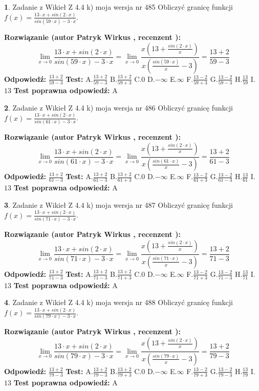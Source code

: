 \documentclass[12pt, a4paper]{article}
\theoremstyle{definition} %
\newtheorem{zad}{}
\newcommand{\zadStart}[1]{\begin{zad}#1\newline}
\newcommand{\zadStop}{\end{zad}}
\newcommand{\rozwStart}[2]{\noindent \textbf{Rozwiązanie (autor #1 , recenzent #2): }\newline}
\newcommand{\rozwStop}{\newline}
\newcommand{\odpStart}{\noindent \textbf{Odpowiedź:}\newline}
\newcommand{\odpStop}{\newline}
\newcommand{\testStart}{\noindent \textbf{Test:}\newline}
\newcommand{\testStop}{\newline}
\newcommand{\kluczStart}{\noindent \textbf{Test poprawna odpowiedź:}\newline}
\newcommand{\kluczStop}{\newline}
\begin{document}
\zadStart{Zadanie z Wikieł Z 4.4 k) moja wersja nr 485}
Obliczyć granicę funkcji $f(x)=\frac{13\cdot x +sin(2\cdot x)}{sin(59\cdot x) -3\cdot x}$.
\zadStop
\rozwStart{Patryk Wirkus}{}
$$\lim\limits_{x\to 0}\frac{13\cdot x +sin(2\cdot x)}{sin(59\cdot x) -3\cdot x}
=\lim\limits_{x\to 0}\frac{x(13+\frac{sin(2\cdot x)}{x})}{x(\frac{sin(59\cdot x)}{x}-3)}
=\frac{13+2}{59-3}$$
\rozwStop
\odpStart
$\frac{13+2}{59-3}$
\odpStop
\testStart
A.$\frac{13+2}{59-3}$
B.$\frac{13+2}{59+3}$
C.$0$
D.$-\infty$
E.$\infty$
F.$\frac{13-2}{59+3}$
G.$\frac{13-2}{59-3}$
H.$\frac{13}{59}$
I.$13$
\testStop
\kluczStart
A
\kluczStop



\zadStart{Zadanie z Wikieł Z 4.4 k) moja wersja nr 486}
Obliczyć granicę funkcji $f(x)=\frac{13\cdot x +sin(2\cdot x)}{sin(61\cdot x) -3\cdot x}$.
\zadStop
\rozwStart{Patryk Wirkus}{}
$$\lim\limits_{x\to 0}\frac{13\cdot x +sin(2\cdot x)}{sin(61\cdot x) -3\cdot x}
=\lim\limits_{x\to 0}\frac{x(13+\frac{sin(2\cdot x)}{x})}{x(\frac{sin(61\cdot x)}{x}-3)}
=\frac{13+2}{61-3}$$
\rozwStop
\odpStart
$\frac{13+2}{61-3}$
\odpStop
\testStart
A.$\frac{13+2}{61-3}$
B.$\frac{13+2}{61+3}$
C.$0$
D.$-\infty$
E.$\infty$
F.$\frac{13-2}{61+3}$
G.$\frac{13-2}{61-3}$
H.$\frac{13}{61}$
I.$13$
\testStop
\kluczStart
A
\kluczStop



\zadStart{Zadanie z Wikieł Z 4.4 k) moja wersja nr 487}
Obliczyć granicę funkcji $f(x)=\frac{13\cdot x +sin(2\cdot x)}{sin(71\cdot x) -3\cdot x}$.
\zadStop
\rozwStart{Patryk Wirkus}{}
$$\lim\limits_{x\to 0}\frac{13\cdot x +sin(2\cdot x)}{sin(71\cdot x) -3\cdot x}
=\lim\limits_{x\to 0}\frac{x(13+\frac{sin(2\cdot x)}{x})}{x(\frac{sin(71\cdot x)}{x}-3)}
=\frac{13+2}{71-3}$$
\rozwStop
\odpStart
$\frac{13+2}{71-3}$
\odpStop
\testStart
A.$\frac{13+2}{71-3}$
B.$\frac{13+2}{71+3}$
C.$0$
D.$-\infty$
E.$\infty$
F.$\frac{13-2}{71+3}$
G.$\frac{13-2}{71-3}$
H.$\frac{13}{71}$
I.$13$
\testStop
\kluczStart
A
\kluczStop



\zadStart{Zadanie z Wikieł Z 4.4 k) moja wersja nr 488}
Obliczyć granicę funkcji $f(x)=\frac{13\cdot x +sin(2\cdot x)}{sin(79\cdot x) -3\cdot x}$.
\zadStop
\rozwStart{Patryk Wirkus}{}
$$\lim\limits_{x\to 0}\frac{13\cdot x +sin(2\cdot x)}{sin(79\cdot x) -3\cdot x}
=\lim\limits_{x\to 0}\frac{x(13+\frac{sin(2\cdot x)}{x})}{x(\frac{sin(79\cdot x)}{x}-3)}
=\frac{13+2}{79-3}$$
\rozwStop
\odpStart
$\frac{13+2}{79-3}$
\odpStop
\testStart
A.$\frac{13+2}{79-3}$
B.$\frac{13+2}{79+3}$
C.$0$
D.$-\infty$
E.$\infty$
F.$\frac{13-2}{79+3}$
G.$\frac{13-2}{79-3}$
H.$\frac{13}{79}$
I.$13$
\testStop
\kluczStart
A
\kluczStop
\end{document}
